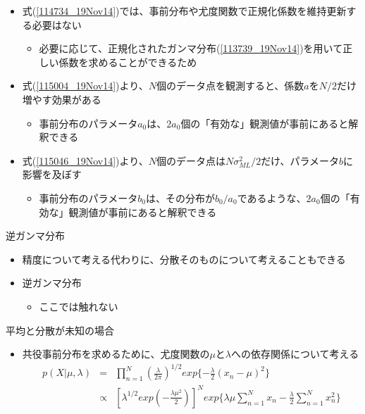 \begin{frame}
 \begin{itemize}
	\item 式(\ref{114734_19Nov14})では、事前分布や尤度関数で正規化係数を維持更新する必要はない
								\begin{itemize}
				 \item 必要に応じて、正規化されたガンマ分布(\ref{113739_19Nov14})を用いて正しい係数を求めることができるため
				\end{itemize}
	\item 式(\ref{115004_19Nov14})より、$N$個のデータ点を観測すると、係数$a$を$N/2$だけ増やす効果がある
				\begin{itemize}
				 \item 事前分布のパラメータ$a_0$は、$2a_0$個の「有効な」観測値が事前にあると解釈できる
				\end{itemize}
	\item 式(\ref{115046_19Nov14})より、$N$個のデータ点は$N\sigma_{ML}^2/2$だけ、パラメータ$b$に影響を及ぼす
				\begin{itemize}
				 \item 事前分布のパラメータ$b_0$は、その分布が$b_0/a_0$であるような、$2a_0$個の「有効な」観測値が事前にあると解釈できる
				\end{itemize}
 \end{itemize}
\end{frame}

\begin{frame}{逆ガンマ分布}
 \begin{itemize}
	\item 精度について考える代わりに、分散そのものについて考えることもできる
	\item 逆ガンマ分布
\begin{itemize}
 \item ここでは触れない
\end{itemize}
 \end{itemize}
\end{frame}

\begin{frame}{平均と分散が未知の場合}
 \begin{itemize}
	\item 共役事前分布を求めるために、尤度関数の$\mu$と$\lambda$への依存関係について考える
				\begin{eqnarray}
				 p(X|\mu,\lambda) &=& \prod_{n=1}^{N}(\frac{\lambda}{2\pi})^{1/2}exp\{-\frac{\lambda}{2}(x_n-\mu)^2\} \nonumber \\
				 &\propto & [\lambda^{1/2}exp(-\frac{\lambda\mu^2}{2})]^{N}exp\{\lambda\mu\sum_{n=1}^{N}x_n-\frac{\lambda}{2}\sum_{n=1}^{N}x_n^2\}
				\end{eqnarray}
 \end{itemize}
\end{frame}

